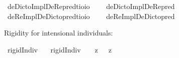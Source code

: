 \begin{isabellebody}
\isamarkupfalse%
\ deDictoImplDeRe{\isacharunderscore}pred{\isacharcolon}{\isacharcolon}{\isachardoublequoteopen}{\isacharparenleft}{\isacharprime}t{\isasymRightarrow}io{\isacharparenright}{\isasymRightarrow}io{\isachardoublequoteclose}\ \isanewline
\ \ \ {\isachardoublequoteopen}deDictoImplDeRe{\isacharunderscore}pred\ {\isasymtau}\ {\isasymequiv}\ \isactrlbold {\isasymforall}{\isasymalpha}{\isachardot}\ \isactrlbold {\isasymbox}{\isacharparenleft}{\isacharparenleft}{\isasymlambda}{\isasymbeta}{\isachardot}\ {\isacharparenleft}{\isasymalpha}\ {\isasymbeta}{\isacharparenright}{\isacharparenright}\ \isactrlbold {\isasymdown}{\isasymtau}{\isacharparenright}\ \isactrlbold {\isasymrightarrow}\ {\isacharparenleft}{\isacharparenleft}{\isasymlambda}{\isasymbeta}{\isachardot}\ \isactrlbold {\isasymbox}{\isacharparenleft}{\isasymalpha}\ {\isasymbeta}{\isacharparenright}{\isacharparenright}\ \isactrlbold {\isasymdown}{\isasymtau}{\isacharparenright}{\isachardoublequoteclose}\isanewline
{}\isamarkupfalse%
\ deReImplDeDicto{\isacharunderscore}pred{\isacharcolon}{\isacharcolon}{\isachardoublequoteopen}{\isacharparenleft}{\isacharprime}t{\isasymRightarrow}io{\isacharparenright}{\isasymRightarrow}io{\isachardoublequoteclose}\ \isanewline
\ \ \ {\isachardoublequoteopen}deReImplDeDicto{\isacharunderscore}pred\ {\isasymtau}\ {\isasymequiv}\ \isactrlbold {\isasymforall}{\isasymalpha}{\isachardot}\ {\isacharparenleft}{\isacharparenleft}{\isasymlambda}{\isasymbeta}{\isachardot}\ \isactrlbold {\isasymbox}{\isacharparenleft}{\isasymalpha}\ {\isasymbeta}{\isacharparenright}{\isacharparenright}\ \isactrlbold {\isasymdown}{\isasymtau}{\isacharparenright}\ \isactrlbold {\isasymrightarrow}\ \isactrlbold {\isasymbox}{\isacharparenleft}{\isacharparenleft}{\isasymlambda}{\isasymbeta}{\isachardot}\ {\isacharparenleft}{\isasymalpha}\ {\isasymbeta}{\isacharparenright}{\isacharparenright}\ \isactrlbold {\isasymdown}{\isasymtau}{\isacharparenright}{\isachardoublequoteclose}%
\isamarkuptrue%
%
\begin{isamarkuptext}%
Rigidity for intensional individuals:%
\end{isamarkuptext}\isamarkuptrue%
\isamarkupfalse%
\ rigidIndiv{\isacharcolon}{\isacharcolon}{\isachardoublequoteopen}{\isasymup}{\isasymlangle}{\isasymup}{\isasymzero}{\isasymrangle}{\isachardoublequoteclose}\ \isanewline
\ \ {\isachardoublequoteopen}rigidIndiv\ {\isasymtau}\ {\isasymequiv}\ {\isacharparenleft}{\isasymlambda}{\isasymbeta}{\isachardot}\ \isactrlbold {\isasymbox}{\isacharparenleft}{\isacharparenleft}{\isasymlambda}z{\isachardot}\ {\isasymbeta}\ \isactrlbold {\isasymapprox}\ z{\isacharparenright}\ \isactrlbold {\isasymdownharpoonleft}{\isasymtau}{\isacharparenright}{\isacharparenright}\ \isactrlbold {\isasymdownharpoonleft}{\isasymtau}{\isachardoublequoteclose}%

\end{isabellebody}
